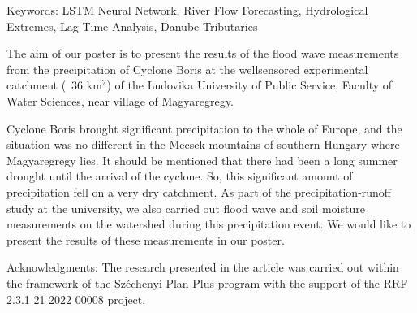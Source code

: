 Keywords: LSTM Neural Network, River Flow Forecasting, Hydrological Extremes, Lag Time Analysis, Danube Tributaries
\newpage{}
{}
\begin{flushleft}






\end{flushleft}

\noindent

The aim of our poster is to present the results of the flood wave measurements from the precipitation of Cyclone Boris at the wellsensored experimental catchment (~36 km$^2$) of the Ludovika University of Public Service, Faculty of Water Sciences, near village of Magyaregregy.

Cyclone Boris brought significant precipitation to the whole of Europe, and the situation was no different in the Mecsek mountains of southern Hungary where Magyaregregy lies. It should be mentioned that there had been a long summer drought until the arrival of the cyclone. So, this significant amount of precipitation fell on a very dry catchment. As part of the precipitation-runoff study at the university, we also carried out flood wave and soil moisture measurements on the watershed during this precipitation event. We would like to present the results of these measurements in our poster.

Acknowledgments:
The research presented in the article was carried out within the framework of the
Széchenyi Plan Plus program with the support of the RRF 2.3.1 21 2022 00008
project.

